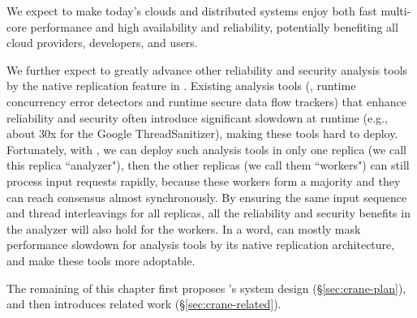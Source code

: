 We expect \crane to make today's clouds and distributed systems enjoy both
fast multi-core performance and high availability and reliability, potentially
benefiting all cloud providers, developers, and users.

We further expect \crane to greatly advance other reliability and security
analysis tools by the native replication feature in \crane. Existing analysis
tools (\eg, runtime concurrency error detectors and runtime secure data flow
trackers) that enhance reliability and security often introduce significant
slowdown at runtime (e.g., about 30x for the Google ThreadSanitizer), making
these tools hard to deploy. Fortunately, with \crane, we can deploy such
analysis tools in only one replica (we call this replica ``analyzer"), then the
other replicas (we call them ``workers") can still process input requests
rapidly, because these workers form a majority and they can reach consensus
almost synchronously. By ensuring the same input sequence and thread
interleavings for all replicas, all the reliability and security benefits in the
analyzer will also hold for the workers. In a word, \crane can mostly mask
performance slowdown for analysis tools by its native replication architecture,
and make these tools more adoptable. 

The remaining of this chapter first proposes \crane's system
design (\S\ref{sec:crane-plan}), and then introduces related
work (\S\ref{sec:crane-related}).
